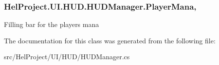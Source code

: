 \hypertarget{class_hel_project_1_1_u_i_1_1_h_u_d_1_1_h_u_d_manager_a394ad7478afc5a6ec3a71c6e3d41995d}{}
\subsubsection[{Player\+Mana}]{ Hel\+Project.\+U\+I.\+H\+U\+D.\+H\+U\+D\+Manager.\+Player\+Mana\hspace{0.3cm}{\ttfamily [get]}, {\ttfamily [set]}}\label{class_hel_project_1_1_u_i_1_1_h_u_d_1_1_h_u_d_manager_a394ad7478afc5a6ec3a71c6e3d41995d}


Filling bar for the player\textquotesingle{}s mana 



The documentation for this class was generated from the following file\+:\begin{DoxyCompactItemize}
\item 
src/\+Hel\+Project/\+U\+I/\+H\+U\+D/H\+U\+D\+Manager.\+cs\end{DoxyCompactItemize}
